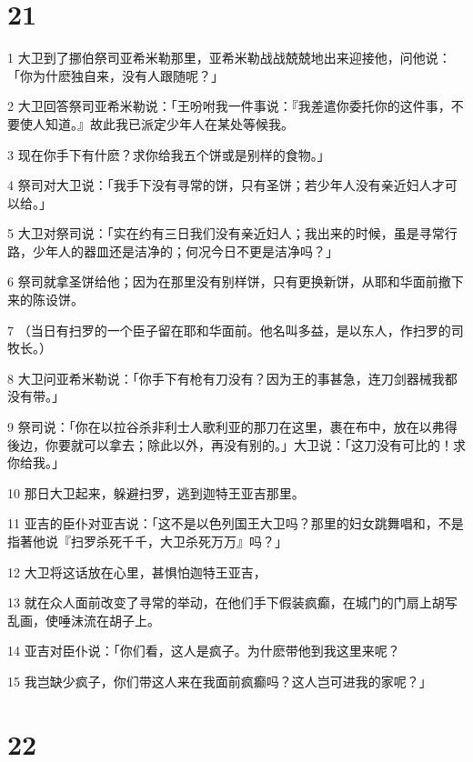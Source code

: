 \chapter{21}

\par 1 大卫到了挪伯祭司亚希米勒那里，亚希米勒战战兢兢地出来迎接他，问他说：「你为什麽独自来，没有人跟随呢？」
\par 2 大卫回答祭司亚希米勒说：「王吩咐我一件事说：『我差遣你委托你的这件事，不要使人知道。』故此我已派定少年人在某处等候我。
\par 3 现在你手下有什麽？求你给我五个饼或是别样的食物。」
\par 4 祭司对大卫说：「我手下没有寻常的饼，只有圣饼；若少年人没有亲近妇人才可以给。」
\par 5 大卫对祭司说：「实在约有三日我们没有亲近妇人；我出来的时候，虽是寻常行路，少年人的器皿还是洁净的；何况今日不更是洁净吗？」
\par 6 祭司就拿圣饼给他；因为在那里没有别样饼，只有更换新饼，从耶和华面前撤下来的陈设饼。
\par 7 （当日有扫罗的一个臣子留在耶和华面前。他名叫多益，是以东人，作扫罗的司牧长。）
\par 8 大卫问亚希米勒说：「你手下有枪有刀没有？因为王的事甚急，连刀剑器械我都没有带。」
\par 9 祭司说：「你在以拉谷杀非利士人歌利亚的那刀在这里，裹在布中，放在以弗得後边，你要就可以拿去；除此以外，再没有别的。」大卫说：「这刀没有可比的！求你给我。」
\par 10 那日大卫起来，躲避扫罗，逃到迦特王亚吉那里。
\par 11 亚吉的臣仆对亚吉说：「这不是以色列国王大卫吗？那里的妇女跳舞唱和，不是指著他说『扫罗杀死千千，大卫杀死万万』吗？」
\par 12 大卫将这话放在心里，甚惧怕迦特王亚吉，
\par 13 就在众人面前改变了寻常的举动，在他们手下假装疯癫，在城门的门扇上胡写乱画，使唾沫流在胡子上。
\par 14 亚吉对臣仆说：「你们看，这人是疯子。为什麽带他到我这里来呢？
\par 15 我岂缺少疯子，你们带这人来在我面前疯癫吗？这人岂可进我的家呢？」

\chapter{22}

